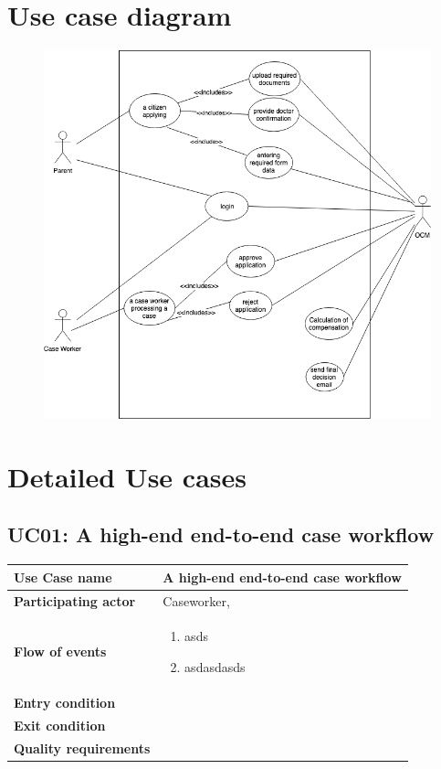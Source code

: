 \documentclass{article}
\begin{document}
\section{Use case diagram}


\begin{figure}[htb!]
	\includegraphics[width=\textwidth]{img/use-cases}
\end{figure}


\section{Detailed Use cases}

\subsection{UC01: A high-end end-to-end case workflow}

\begin{tabularx}{\textwidth}{l|l}
	\textbf{Use Case name} & A high-end end-to-end case workflow \\
	\hline
	\textbf{Participating actor} & Caseworker, \\
	\hline
	\textbf{Flow of events} &
	\begin{minipage}{\linewidth}
		\begin{enumerate}
			\item asds
			\item asdasdasds
		\end{enumerate} 
	\end{minipage}\\
	\hline
	\textbf{Entry condition} & \\
	\hline
	\textbf{Exit condition} & \\
	\hline
	\textbf{Quality requirements} & \\
\end{tabularx}
\end{document}

